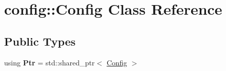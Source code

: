 \hypertarget{classconfig_1_1Config}{}\section{config\+:\+:Config Class Reference}
\label{classconfig_1_1Config}
\subsection*{Public Types}
\begin{DoxyCompactItemize}
\item 
using {\bfseries Ptr} = std\+::shared\+\_\+ptr$<$ \hyperlink{classconfig_1_1Config}{Config} $>$\hypertarget{classconfig_1_1Config_ac364fe9ee5c3a354287b88a4c53ed1c0}{}\label{classconfig_1_1Config_ac364fe9ee5c3a354287b88a4c53ed1c0}

\end{DoxyCompactItemize}
